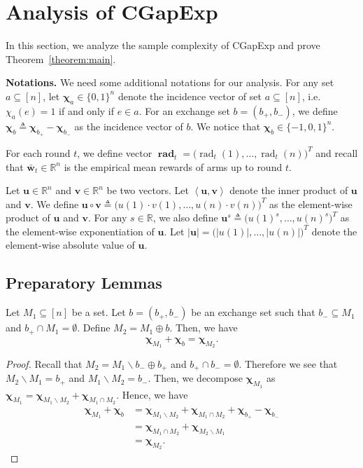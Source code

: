 \documentclass{article}
\newcommand{\Algorithm}{{\small \textsf{CGapExp}}\xspace}
\newcommand{\del}{\backslash}
\newcommand{\RR}{\mathbb R}
\DeclareMathOperator{\rad}{rad}
\newcommand{\inn}[1]{\left\langle #1 \right\rangle}
\renewcommand{\vec}[1]{\boldsymbol{#1}}
\renewcommand{\odot}{\circ}
\begin{document}
\section{Analysis of \Algorithm}

In this section, we analyze the sample complexity of \Algorithm and prove Theorem~\ref{theorem:main}.

\textbf{Notations.} 
We need some additional notations for our analysis.
For any set $a\subseteq [n]$, let $\vec \chi_a \in \{0,1\}^n$ denote the incidence vector of set $a \subseteq [n]$, i.e. $\chi_a(e) = 1$ if and only if $e\in a$.
For an exchange set $b=(b_+,b_-)$, we define $\vec \chi_b \triangleq \vec \chi_{b_+}- \vec \chi_{b_-}$ as the incidence vector of $b$.
We notice that $\vec \chi_b \in \{-1,0,1\}^n$.

For each round $t$, we define vector $\vec\rad_t = \big(\rad_t(1),\ldots,\rad_t(n)\big)^T$ and recall that $\vec {\bar w}_t\in \RR^n$ is the empirical mean rewards of arms up to round $t$.

Let $\vec u\in \RR^n$ and $\vec v\in \RR^n$ be two vectors.
Let $\inn{\vec u, \vec v}$ denote the inner product of $\vec u$ and $\vec v$.
We define $\vec u \odot \vec v \triangleq \big(u(1)\cdot v(1),\ldots,u(n)\cdot v(n)\big)^T$ as the element-wise product of $\vec u$ and $\vec v$.
For any $s\in \RR$, we also define $\vec u^s \triangleq \big(u(1)^s, \ldots, u(n)^s)^T$ as the element-wise exponentiation of $\vec u$.
Let $|\vec u| = \big(|u(1)|, \ldots, |u(n)|\big)^T$ denote the element-wise absolute value of $\vec u$.



\subsection{Preparatory Lemmas}


\begin{lemma}
Let $M_1 \subseteq [n]$ be a set.
Let $b=(b_+,b_-)$ be an exchange set such that 
$b_-\subseteq M_1$ and $b_+ \cap M_1 = \emptyset$.
Define $M_2 = M_1 \oplus b$.
Then, we have 
$$
\vec\chi_{M_1} +\vec\chi_{b} = \vec\chi_{M_2}.
$$
\label{lemma:exchange-char}
\end{lemma}

\begin{proof}
Recall that $M_2 = M_1 \del b_- \oplus b_+$ and $b_+\cap b_-=\emptyset$.
Therefore we see that $M_2 \del M_1 = b_+$ and $M_1 \del M_2 = b_-$.
Then, we decompose $\vec\chi_{M_1}$ as $\vec\chi_{M_1}=\vec\chi_{M_1\del M_2}+\vec\chi_{M_1\cap M_2}$.
Hence, we have
\begin{align*}
   \vec\chi_{M_1}+\vec\chi_{b} &= \vec\chi_{M_1\del M_2}+\vec\chi_{M_1\cap M_2} + \vec\chi_{b_+}-\vec\chi_{b_-}\\
   							   &= \vec\chi_{M_1\cap M_2} + \vec\chi_{M_2\del M_1}\\
   							   &= \vec\chi_{M_2}.
\end{align*}
\end{proof}
\end{document}
